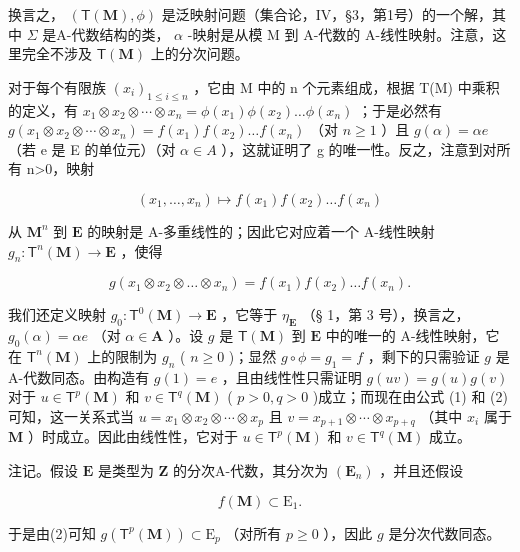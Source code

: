 换言之， \((\mathsf{T}(\mathbf{M}), \phi)\) 是泛映射问题（集合论，IV，§3，第1号）的一个解，其中 \(\Sigma\) 是A-代数结构的类， \(\alpha\) -映射是从模 M 到 A-代数的 A-线性映射。注意，这里完全不涉及 \(\mathsf{T}(\mathbf{M})\) 上的分次问题。

对于每个有限族 \((x_{i})_{1\leqslant i\leqslant n}\) ，它由 M 中的 n 个元素组成，根据 T(M) 中乘积的定义，有 \(x_{1}\otimes x_{2}\otimes\cdots\otimes x_{n}=\phi(x_{1})\phi(x_{2})\ldots\phi(x_{n})\) ；于是必然有 \(g(x_{1}\otimes x_{2}\otimes\cdots\otimes x_{n})=f(x_{1})f(x_{2})\ldots f(x_{n})\) （对 \(n\geqslant1\) ）且 \(g(\alpha)=\alpha e\) （若 e 是 E 的单位元）（对 \(\alpha\in A\) ），这就证明了 g 的唯一性。反之，注意到对所有 n\textgreater0，映射

\[
(x _ {1}, \dots , x _ {n}) \mapsto f (x _ {1}) f (x _ {2}) \dots f (x _ {n})
\]

从 \(\mathbf{M}^n\) 到 \(\mathbf{E}\) 的映射是 A-多重线性的；因此它对应着一个 A-线性映射 \(g_n: \mathsf{T}^n(\mathbf{M}) \to \mathbf{E}\) ，使得

\[
g \left(x _ {1} \otimes x _ {2} \otimes \dots \otimes x _ {n}\right) = f \left(x _ {1}\right) f \left(x _ {2}\right) \dots f \left(x _ {n}\right).\tag{2}
\]

我们还定义映射 \(g_0 \colon \mathsf{T}^0(\mathbf{M}) \to \mathbf{E}\) ，它等于 \(\eta_{\mathbf{E}}\) （§ 1，第 3 号），换言之， \(g_0(\alpha) = \alpha e\) （对 \(\alpha \in \mathbf{A}\) ）。设 \(g\) 是 \(\mathsf{T}(\mathbf{M})\) 到 \(\mathbf{E}\) 中的唯一的 A-线性映射，它在 \(\mathsf{T}^n(\mathbf{M})\) 上的限制为 \(g_n\) ( \(n \geqslant 0\) )；显然 \(g \circ \phi = g_1 = f\) ，剩下的只需验证 \(g\) 是 A-代数同态。由构造有 \(g(1) = e\) ，且由线性性只需证明 \(g(uv) = g(u)g(v)\) 对于 \(u \in \mathsf{T}^p(\mathbf{M})\) 和 \(v \in \mathsf{T}^q(\mathbf{M})\) ( \(p > 0, q > 0\) )成立；而现在由公式 (1) 和 (2) 可知，这一关系式当 \(u = x_1 \otimes x_2 \otimes \cdots \otimes x_p\) 且 \(v = x_{p+1} \otimes \cdots \otimes x_{p+q}\) （其中 \(x_i\) 属于 \(\mathbf{M}\) ）时成立。因此由线性性，它对于 \(u \in \mathsf{T}^p(\mathbf{M})\) 和 \(v \in \mathsf{T}^q(\mathbf{M})\) 成立。

注记。假设 \(\mathbf{E}\) 是类型为 \(\mathbf{Z}\) 的分次A-代数，其分次为 \((\mathbf{E}_n)\) ，并且还假设

\[
f (\mathbf {M}) \subset \mathrm{E} _ {1}.\tag{3}
\]

于是由(2)可知 \(g(\mathsf{T}^p (\mathbf{M})) \subset \mathrm{E}_p\) （对所有 \(p \geqslant 0\) ），因此 \(g\) 是分次代数同态。

